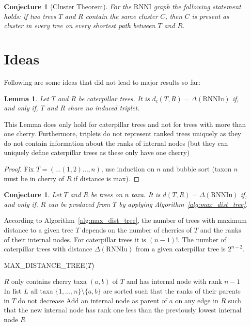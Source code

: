 \documentclass[11pt, a4paper]{article}
\newcommand{\rnni}{\mathrm{RNNI}}
\newcommand{\rnniu}{\mathrm{RNNIu}}
\newtheorem{conjecture}[definition]{Conjecture}
\newtheorem{lemma}[definition]{Lemma}
\begin{document}
\begin{conjecture}[Cluster Theorem]
	For the $\rnni$ graph the following statement holds:
	if two trees $T$ and $R$ contain the same cluster $C$, then $C$ is present as cluster in every tree on every shortest path between $T$ and $R$.
	\label{cluster_theorem}
\end{conjecture}


\section{Ideas}

Following are some ideas that did not lead to major results so far:

\begin{lemma}
    Let $T$ and $R$ be caterpillar trees.
    It is $d_c(T,R) = \Delta(\rnniu)$ if, and only if, $T$ and $R$ share no induced triplet.
\end{lemma}

This Lemma does only hold for caterpillar trees and not for trees with more than one cherry.
Furthermore, triplets do not represent ranked trees uniquely as they do not contain information about the ranks of internal nodes (but they can uniquely define caterpillar trees as these only have one cherry)

\begin{proof}
    Fix $T = (\ldots(1,2) \ldots ,n)$, use induction on $n$ and bubble sort (taxon $n$ must be in cherry of $R$ if distance is max).
\end{proof}

\begin{conjecture}
    Let $T$ and $R$ be trees on $n$ taxa.
    It is $d(T,R) = \Delta(\rnniu)$ if, and only if, $R$ can be produced from $T$ by applying Algorithm~\ref{alg:max_dist_tree}.
\end{conjecture}

According to Algorithm~\ref{alg:max_dist_tree}, the number of trees with maximum distance to a given tree $T$ depends on the number of cherries of $T$ and the ranks of their internal nodes.
For caterpillar trees it is $(n-1)!$.
The number of caterpillar trees with distance $\Delta(\rnniu)$ from a given caterpillar tree is $2^{n-2}$.

\begin{algorithm}[H]
\caption{MAX\_DISTANCE\_TREE($T$)}
\label{alg:max_dist_tree}
\begin{algorithmic}[1]
	\STATE $R$ only contains cherry taxa $(a,b)$ of $T$ and has internal node with rank $n-1$
    \STATE In list $L$ all taxa $\{1,\ldots,n\}\setminus\{a,b\}$ are sorted such that the ranks of their parents in $T$ do not decrease
		\STATE Add an internal node as parent of $a$ on any edge in $R$ such that the new internal node has rank one less than the previously lowest internal node
	\ENDFOR
	\RETURN $R$
\end{algorithmic}
\end{algorithm}
\end{document}
